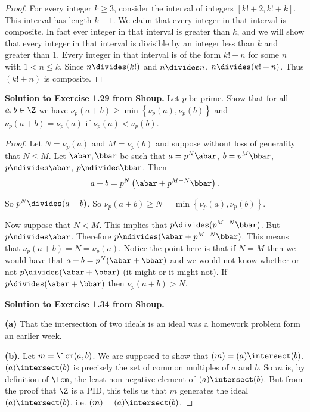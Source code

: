 \documentclass[oneside,12pt]{amsart}
\begin{document}
\begin{proof}
For every integer $k\geq 3$, consider the interval of integers ${[k!+2, k!+k]}$. This interval has length $k-1$.
We claim that every integer in that interval is composite. In fact ever integer in that interval is greater than $k$,
and we will show that every integer in that interval is divisible by an integer less than $k$ and greater than 1.
Every integer in that interval is of the form $k!+n$ for some $n$ with $1< n \leq k$. Since $n\divides (k!)$
and $n\divides n$, $n\divides (k!+n)$. Thus $(k!+n)$ is composite.
\end{proof}

\bigskip

\textbf{Solution to Exercise 1.29 from Shoup.} Let $p$ be prime. Show that for all $a,b\in\Z$ we have
$\nu_p(a+b)\geq\min\left\{\nu_p(a),\nu_p(b)\right\}$ and $\nu_p(a+b)=\nu_p(a)$ if $\nu_p(a)<\nu_p(b)$.

\begin{proof}
Let $N=\nu_p(a)$ and $M=\nu_p(b)$ and suppose without loss of generality that $N\leq M$.
Let $\abar,\bbar$ be such that $a=p^N\abar$, $b=p^M\bbar$, $p\ndivides\abar$, $p\ndivides\bbar$.
Then 
$$a+b=p^N\left(\abar+p^{M-N}\bbar\right).$$

 So $p^N\divides(a+b)$. So $\nu_p(a+b)\geq N = \min\left\{\nu_p(a),\nu_p(b)\right\}$.

Now suppose that $N<M$. This implies that $p\divides(p^{M-N}\bbar)$. But $p\ndivides\abar$.
Therefore $p\ndivides(\abar+p^{M-N}\bbar)$. This means that $\nu_p(a+b)=N=\nu_p(a)$.
Notice the point here is that if $N=M$ then we would have that $a+b=p^N(\abar+\bbar)$
and we would not know whether or not $p\divides(\abar+\bbar)$ (it might or it might not).
If $p\divides(\abar+\bbar)$ then $\nu_p(a+b) > N$.

\bigskip

\textbf{Solution to Exercise 1.34 from Shoup.}

\textbf{(a)} That the intersection of two ideals is an ideal was a homework problem form an earlier week.

\bigskip

\textbf{(b)}. Let $m=\lcm(a,b)$. We are supposed to show that $(m) = (a) \intersect (b)$.
$(a) \intersect (b)$ is precisely the set of common multiples of $a$ and $b$. So $m$ is, by definition
of $\lcm$, the least non-negative element of $(a)\intersect(b)$. But from the proof that
$\Z$ is a PID, this tells us that $m$ generates the ideal $(a)\intersect(b)$, i.e.
$(m)=(a)\intersect(b)$.

\end{proof}
\end{document}
